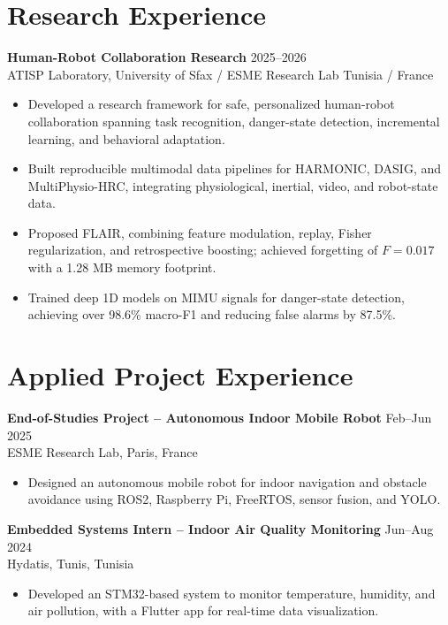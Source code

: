 \documentclass[a4paper,10pt]{article}
\begin{document}
\section*{Research Experience}
\textbf{Human-Robot Collaboration Research} \hfill 2025--2026\\
ATISP Laboratory, University of Sfax / ESME Research Lab \hfill Tunisia / France
\begin{itemize}
  \item Developed a research framework for safe, personalized human-robot collaboration spanning task recognition, danger-state detection, incremental learning, and behavioral adaptation.
  \item Built reproducible multimodal data pipelines for HARMONIC, DASIG, and MultiPhysio-HRC, integrating physiological, inertial, video, and robot-state data.
  \item Proposed FLAIR, combining feature modulation, replay, Fisher regularization, and retrospective boosting; achieved forgetting of $F=0.017$ with a 1.28 MB memory footprint.
  \item Trained deep 1D models on MIMU signals for danger-state detection, achieving over 98.6\% macro-F1 and reducing false alarms by 87.5\%.
\end{itemize}

\section*{Applied Project Experience}
\textbf{End-of-Studies Project -- Autonomous Indoor Mobile Robot} \hfill Feb--Jun 2025\\
ESME Research Lab, Paris, France
\begin{itemize}
  \item Designed an autonomous mobile robot for indoor navigation and obstacle avoidance using ROS2, Raspberry Pi, FreeRTOS, sensor fusion, and YOLO.%
\end{itemize}

\textbf{Embedded Systems Intern -- Indoor Air Quality Monitoring} \hfill Jun--Aug 2024\\
Hydatis, Tunis, Tunisia
\begin{itemize}
  \item Developed an STM32-based system to monitor temperature, humidity, and air pollution, with a Flutter app for real-time data visualization.%
\end{itemize}
\end{document}

